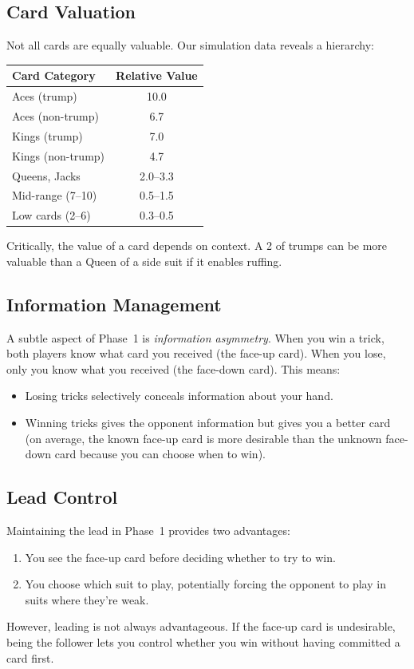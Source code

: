 \subsection{Card Valuation}

Not all cards are equally valuable. Our simulation data reveals a hierarchy:

\begin{center}
\begin{tabular}{lc}
\toprule
Card Category & Relative Value \\
\midrule
Aces (trump) & 10.0 \\
Aces (non-trump) & 6.7 \\
Kings (trump) & 7.0 \\
Kings (non-trump) & 4.7 \\
Queens, Jacks & 2.0--3.3 \\
Mid-range (7--10) & 0.5--1.5 \\
Low cards (2--6) & 0.3--0.5 \\
\bottomrule
\end{tabular}
\end{center}

Critically, the value of a card depends on context. A 2 of trumps can be
more valuable than a Queen of a side suit if it enables ruffing.

\subsection{Information Management}

A subtle aspect of Phase~1 is \emph{information asymmetry}. When you win a
trick, both players know what card you received (the face-up card). When you
lose, only you know what you received (the face-down card). This means:
\begin{itemize}
  \item Losing tricks selectively conceals information about your hand.
  \item Winning tricks gives the opponent information but gives you a better
    card (on average, the known face-up card is more desirable than the
    unknown face-down card because you can choose when to win).
\end{itemize}

\subsection{Lead Control}

Maintaining the lead in Phase~1 provides two advantages:
\begin{enumerate}
  \item You see the face-up card before deciding whether to try to win.
  \item You choose which suit to play, potentially forcing the opponent to
    play in suits where they're weak.
\end{enumerate}

However, leading is not always advantageous. If the face-up card is
undesirable, being the follower lets you control whether you win without
having committed a card first.
